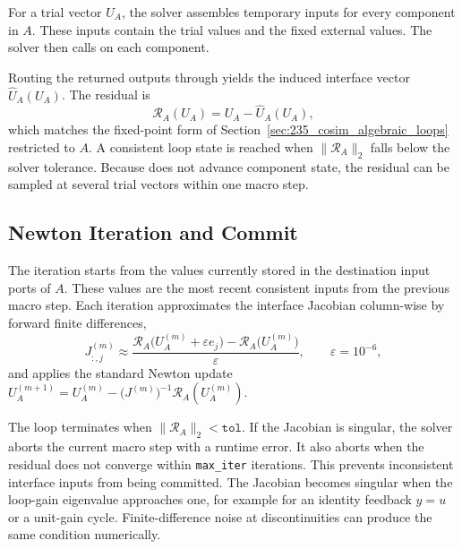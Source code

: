 For a trial vector $U_{A}$, the solver assembles temporary inputs for every component in $A$.
These inputs contain the trial values and the fixed external values.
The solver then calls  on each component.

Routing the returned outputs through  yields the induced interface vector $\widehat{U}_{A}(U_{A})$.
The residual is
\begin{equation}
  \mathcal{R}_{A}(U_{A}) = U_{A} - \widehat{U}_{A}(U_{A}),
\end{equation}
which matches the fixed-point form of Section~\ref{sec:235_cosim_algebraic_loops} restricted to $A$.
A consistent loop state is reached when $\|\mathcal{R}_{A}\|_2$ falls below the solver tolerance.
Because  does not advance component state, the residual can be sampled at several trial vectors within one macro step.

\subsection{Newton Iteration and Commit}
\label{sec:impl_algebraic_loops_newton}

The iteration starts from the values currently stored in the destination input ports of $A$.
These values are the most recent consistent inputs from the previous macro step.
Each iteration approximates the interface Jacobian column-wise by forward finite differences,
\begin{equation}
  J^{(m)}_{:,j} \approx
  \frac{
    \mathcal{R}_{A}\!\bigl(U_{A}^{(m)} + \varepsilon e_j\bigr)
    - \mathcal{R}_{A}\!\bigl(U_{A}^{(m)}\bigr)
  }{\varepsilon},
  \qquad \varepsilon = 10^{-6},
\end{equation}
and applies the standard Newton update $U_{A}^{(m+1)} = U_{A}^{(m)} - \bigl(J^{(m)}\bigr)^{-1}\mathcal{R}_{A}(U_{A}^{(m)})$.

The loop terminates when $\|\mathcal{R}_{A}\|_2<\texttt{tol}$.
If the Jacobian is singular, the solver aborts the current macro step with a runtime error.
It also aborts when the residual does not converge within \texttt{max\_iter} iterations.
This prevents inconsistent interface inputs from being committed.
The Jacobian becomes singular when the loop-gain eigenvalue approaches one, for example for an identity feedback $y=u$ or a unit-gain cycle.
Finite-difference noise at discontinuities can produce the same condition numerically.

